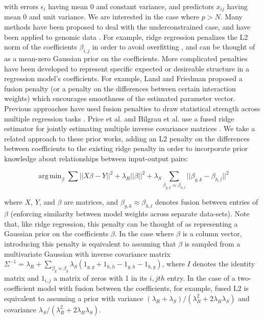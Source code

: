 \documentclass[11pt]{article}
\DeclareMathOperator*{\argmin}{arg\,min}
\begin{document}
with errors $\epsilon_i$ having mean 0 and constant variance, and predictors $x_{ij}$ having mean 0 and unit variance. We are interested in the case where $p > N$. Many methods have been proposed to deal with the underconstrained case, and have been applied to genomic data \cite{waldron_optimized_2011, li_network-constrained_2008}. For example, ridge regression penalizes the L2 norm of the coefficients $\beta_{i,j}$ in order to avoid overfitting \cite{hoerl_ridge_1970}, and can be thought of as a mean-zero Gaussian prior on the coefficients. 
More complicated penalties have been developed to represent specific expected or desireable structure in a regression model's coefficients. 
For example, Land and Friedman \cite{citeulike3780356} proposed a fusion penalty (or a penalty on the differences between certain interaction weights) which encourages smoothness of the estimated parameter vector. Previous approaches have used  fusion penalties to draw statistical strength across multiple regression tasks \cite{kim_tree-guided_2012,Land1997,Chen2010,Petry2011,Hebiri2011}. 
Price et al. and Bilgrau et al. use a fused ridge estimator for jointly estimating multiple inverse covariance matrices \cite{Price2014a,Bilgrau2015}.
We take a related approach to these prior works, adding an L2 penalty on the differences between coefficients to the existing ridge penalty in order to incorporate prior knowledge about relationships between input-output pairs:

\begin{equation}
\argmin_{\beta} \displaystyle\sum \vert \vert X\beta - Y \vert \vert ^2 + \lambda_R \vert \vert \beta \vert \vert ^2 +  \lambda_S  \displaystyle \sum_{\beta_{g,k} \approx \beta_{h,l}} || \beta_{g,k} - \beta_{h,l} ||^2
\label{eqn:main}
\end{equation}

where $X$, $Y$, and $\beta$ are matrices, and $\beta_{g,k} \approx \beta_{h,l}$ denotes fusion between entries of $\beta$ (enforcing similarity between model weights across separate data-sets). 
Note that, like ridge regression, this penalty can be thought of as representing a Gaussian prior on the coefficients $\beta$. 
In the case where $\beta$ is a column vector, introducing this penalty is equivalent to assuming that $\beta$ is sampled from a multivariate Gaussian with inverse covariance matrix $\Sigma^{-1} = \lambda_R + \displaystyle \sum_{\beta_g \approx \beta_g} \lambda_S (1_{g,g} + 1_{h,h} - 1_{g,h} - 1_{h,g})$, where $I$ denotes the identity matrix and $1_{i,j}$ a matrix of zeros with 1 in its $i, jth$ entry. 
In the case of a two-coefficient model with fusion between the coefficients, for example, fused L2 is equivalent to assuming a prior with variance $(\lambda_R + \lambda_S)/(\lambda_R^2+2\lambda_R\lambda_S)$ and covariance $\lambda_S/(\lambda_R^2+2\lambda_R\lambda_S)$.
\end{document}
